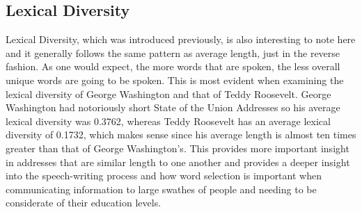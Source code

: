 \subsection{Lexical Diversity}
Lexical Diversity, which was introduced previously, is also interesting to note here and it generally follows the same pattern as average length, just in the reverse fashion.
As one would expect, the more words that are spoken, the less overall unique words are going to be spoken.
This is most evident when examining the lexical diversity of George Washington and that of Teddy Roosevelt.
George Washington had notoriously short State of the Union Addresses so his average lexical diversity was 0.3762, whereas Teddy Roosevelt has an average lexical diversity of 0.1732, which makes sense since his average length is almost ten times greater than that of George Washington's.
This provides more important insight in addresses that are similar length to one another and provides a deeper insight into the speech-writing process and how word selection is important when communicating information to large swathes of people and needing to be considerate of their education levels.

